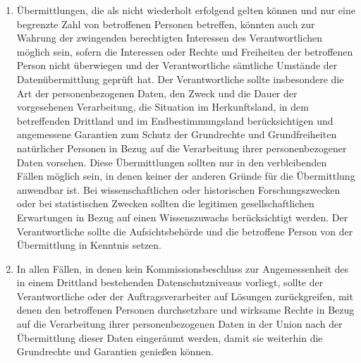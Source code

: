 \begin{enumerate}
   \item Übermittlungen, die als nicht wiederholt erfolgend gelten können und nur eine begrenzte Zahl von betroffenen
    Personen betreffen, könnten auch zur Wahrung der zwingenden berechtigten Interessen des Verantwortlichen möglich
    sein, sofern die Interessen oder Rechte und Freiheiten der betroffenen Person nicht überwiegen und der
    Verantwortliche sämtliche Umstände der Datenübermittlung geprüft hat. Der Verantwortliche sollte insbesondere die
    Art der personenbezogenen Daten, den Zweck und die Dauer der vorgesehenen Verarbeitung, die Situation im
    Herkunftsland, in dem betreffenden Drittland und im Endbestimmungsland berücksichtigen und angemessene Garantien
    zum Schutz der Grundrechte und Grundfreiheiten natürlicher Personen in Bezug auf die Verarbeitung ihrer
    personenbezogener Daten vorsehen. Diese Übermittlungen sollten nur in den verbleibenden Fällen möglich sein, in
    denen keiner der anderen Gründe für die Übermittlung anwendbar ist. Bei wissenschaftlichen oder historischen
    Forschungszwecken oder bei statistischen Zwecken sollten die legitimen gesellschaftlichen Erwartungen in Bezug auf
    einen Wissenszuwachs berücksichtigt werden. Der Verantwortliche sollte die Aufsichtsbehörde und die betroffene
    Person von der Übermittlung in Kenntnis setzen.%
   \label{eg:113}
   

   \item In allen Fällen, in denen kein Kommissionsbeschluss zur Angemessenheit des in einem Drittland bestehenden
    Datenschutzniveaus vorliegt, sollte der Verantwortliche oder der Auftragsverarbeiter auf Lösungen zurückgreifen,
    mit denen den betroffenen Personen durchsetzbare und wirksame Rechte in Bezug auf die Verarbeitung ihrer
    personenbezogenen Daten in der Union nach der Übermittlung dieser Daten eingeräumt werden, damit sie weiterhin die
    Grundrechte und Garantien genießen können.%
   \label{eg:114}
   


\end{enumerate}
